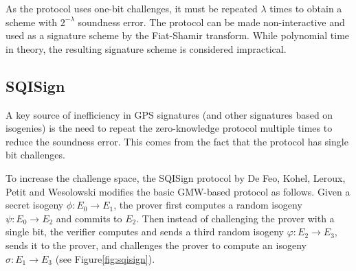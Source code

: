 As the protocol uses one-bit challenges, it must be repeated $\lambda$ times to obtain a scheme with $2^{-\lambda}$ soundness error.
The protocol can be made non-interactive and used as a signature scheme by the Fiat-Shamir transform. While polynomial time in theory, the resulting signature scheme is considered impractical.






\subsection{SQISign \label{sec:SQIsign}}

A key source of inefficiency in GPS signatures (and other signatures based on isogenies) is the need to repeat the zero-knowledge protocol multiple times to reduce the soundness error. This comes from the fact that the protocol has single bit challenges.


To increase the challenge space, the SQISign protocol by De Feo, Kohel, Leroux, Petit and Wesolowski modifies the basic GMW-based protocol as follows. Given a secret isogeny $\phi:E_0\rightarrow E_1$, the prover first computes a random isogeny $\psi:E_0\rightarrow E_2$ and commits to $E_2$. Then instead of challenging the prover with a single bit, the verifier computes and sends a third random isogeny $\varphi:E_2\rightarrow E_3$, sends it to the prover, and challenges the prover to compute an isogeny $\sigma:E_1\rightarrow E_3$ (see Figure\ref{fig:sqisign}).

